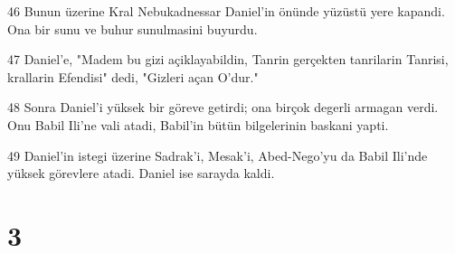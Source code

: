 \par 46 Bunun üzerine Kral Nebukadnessar Daniel'in önünde yüzüstü yere kapandi. Ona bir sunu ve buhur sunulmasini buyurdu.
\par 47 Daniel'e, "Madem bu gizi açiklayabildin, Tanrin gerçekten tanrilarin Tanrisi, krallarin Efendisi" dedi, "Gizleri açan O'dur."
\par 48 Sonra Daniel'i yüksek bir göreve getirdi; ona birçok degerli armagan verdi. Onu Babil Ili'ne vali atadi, Babil'in bütün bilgelerinin baskani yapti.
\par 49 Daniel'in istegi üzerine Sadrak'i, Mesak'i, Abed-Nego'yu da Babil Ili'nde yüksek görevlere atadi. Daniel ise sarayda kaldi.

\chapter{3}

